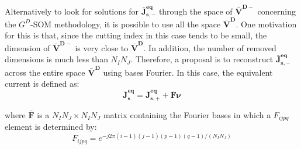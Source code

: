 			Alternatively to look for solutions for $\mathbf{\bar{J}^{eq}_{s,-}}$ through the space of $\mathbf{\bar{V}^{D-}}$ concerning the $G^D$-SOM methodology, it is possible to use all the space $\mathbf{\bar{V}^{D}}$. One motivation for this is that, since the cutting index in this case tends to be small, the dimension of $\mathbf{\bar{V}^{D-}}$ is very close to $\mathbf{\bar{V}^{D}}$. In addition, the number of removed dimensions is much less than $N_IN_J$. Therefore, a proposal is to reconstruct $\mathbf{\bar{J}^{eq}_{s,-}}$ across the entire space $\mathbf{\bar{V}^{D}}$ using bases Fourier. In this case, the equivalent current is defined as:
			\begin{equation}
				\mathbf{\bar{J}^{eq}_{s}} = \mathbf{\bar{J}^{eq}_{s,+}} + \mathbf{\bar{F}}\boldsymbol{\nu} \label{eq:3:deterministic:som:nfftsom}
			\end{equation}
			
			\noindent where $\mathbf{\bar{F}}$ is a $N_IN_J\times N_IN_J$ matrix containing the Fourier bases in which a $F_{ijpq}$ element is determined by:
			\begin{equation}
				F_{ijpq} = e^{-j2\pi(i-1)(j-1)(p-1)(q-1)/(N_IN_J)} \label{eq:3:fourierbases}
			\end{equation}
		
